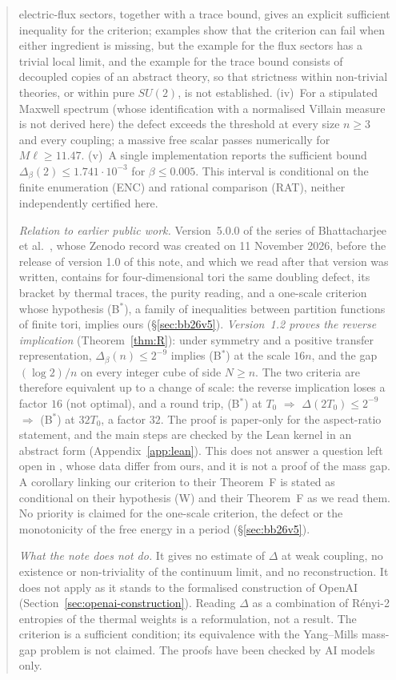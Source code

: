 \documentclass[11pt,a4paper]{article}
\theoremstyle{plain}
\theoremstyle{definition}
\theoremstyle{remark}
\numberwithin{equation}{section}
\begin{document}
\begin{abstract}
electric-flux sectors, together with a trace bound, gives an explicit sufficient inequality for the criterion; examples show that the criterion can fail when either ingredient is missing, but the example for the flux sectors has a trivial local limit, and the example for the trace bound consists of decoupled copies of an abstract theory, so that strictness within non-trivial theories, or within pure $SU(2)$, is not established.
(iv)~For a stipulated Maxwell spectrum (whose identification with a normalised Villain measure is not derived here) the defect exceeds the
threshold at every size $n\ge3$ and every coupling; a massive free scalar passes numerically for $M\ell\ge11.47$.
(v)~A single implementation reports the sufficient bound $\Delta_\beta(2)\le1.741\cdot10^{-3}$ for $\beta\le0.005$. This interval is conditional on the finite enumeration (ENC) and rational comparison (RAT), neither independently certified here.

\emph{Relation to earlier public work.} Version~5.0.0 of the series of Bhattacharjee et al.\ \cite{BB26v5}, whose Zenodo record was
created on 11 November 2026, before the release of version 1.0 of this note, and which we read after that version was written, contains for four-dimensional
tori the same doubling defect, its bracket by thermal traces, the purity reading, and a one-scale criterion whose hypothesis (B$^*$), a family of
inequalities between partition functions of finite tori, implies ours (\S\ref{sec:bb26v5}). \emph{Version~1.2 proves the reverse implication} (Theorem~\ref{thm:R}):
under symmetry and a positive transfer representation, $\Delta_\beta(n)\le2^{-9}$ implies (B$^*$) at the scale $16n$, and the gap
$(\log2)/n$ on every integer cube of side $N\ge n$. The two criteria are therefore equivalent up to a change of scale: the reverse implication loses a factor $16$ (not optimal), and a round trip, (B$^*$) at $T_0$ $\Rightarrow$ $\Delta(2T_0)\le2^{-9}$ $\Rightarrow$ (B$^*$) at $32T_0$, a factor $32$. The proof is paper-only for the aspect-ratio statement, and the main steps are checked by the Lean kernel in an abstract form (Appendix~\ref{app:lean}).
This does not answer a question left open in \cite{BB26v5}, whose data differ from ours, and it is not a proof of the mass gap. A corollary linking our criterion to their
Theorem~F is stated as conditional on their hypothesis (W) and their Theorem~F as we read them. No priority is claimed for the one-scale criterion, the defect or the monotonicity of the free energy in a period (\S\ref{sec:bb26v5}).

\emph{What the note does not do.} It gives no estimate of $\Delta$ at weak coupling, no existence or non-triviality of the continuum limit,
and no reconstruction. It does not apply as it stands to the formalised construction of OpenAI (Section~\ref{sec:openai-construction}).
Reading $\Delta$ as a combination of R\'enyi-2 entropies of the thermal weights is a reformulation, not a result. The criterion is a sufficient
condition; its equivalence with the Yang--Mills mass-gap problem is not claimed. The proofs have been checked by AI models only.


\end{abstract}
\end{document}

